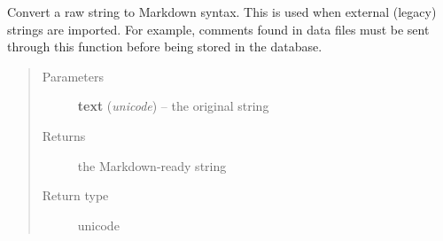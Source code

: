 \documentclass[a4paper,11pt,english]{sphinxmanual}
\begin{document}
\begin{fulllineitems}
\label{programming/remote_client:jb_remote.common.sanitize_for_markdown}
Convert a raw string to Markdown syntax.  This is used when external
(legacy) strings are imported.  For example, comments found in data files
must be sent through this function before being stored in the database.
\begin{quote}\begin{description}
\item[{Parameters}] \leavevmode
\textbf{text} (\emph{unicode}) -- the original string

\item[{Returns}] \leavevmode
the Markdown-ready string

\item[{Return type}] \leavevmode
unicode

\end{description}\end{quote}

\end{fulllineitems}

\label{programming/remote_client:module-jb_remote.samples}
\end{document}
